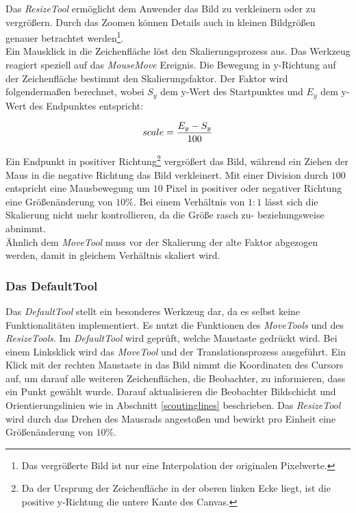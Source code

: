 Das \textit{ResizeTool} ermöglicht dem Anwender das Bild zu verkleinern oder zu vergrößern. Durch das Zoomen können Details auch in kleinen Bildgrößen genauer betrachtet werden\footnote{Das vergrößerte Bild ist nur eine Interpolation der originalen Pixelwerte.}.\\
Ein Mausklick in die Zeichenfläche löst den Skalierungsprozess aus. Das Werkzeug reagiert speziell auf das \textit{MouseMove} Ereignis. Die Bewegung in y-Richtung auf der Zeichenfläche bestimmt den Skalierungsfaktor. Der Faktor wird folgendermaßen berechnet, wobei $S_y$ dem y-Wert des Startpunktes  und $E_y$ dem y-Wert des Endpunktes entspricht: 

\begin{equation}
scale = \frac{E_y - S_y}{100}
\vspace{0.5cm}
\end{equation}

Ein Endpunkt in positiver Richtung\footnote{Da der Ursprung der Zeichenfläche in der oberen linken Ecke liegt, ist die positive y-Richtung die untere Kante des Canvas.} vergrößert das Bild, während ein Ziehen der Maus in die negative Richtung das Bild verkleinert. Mit einer Division durch $100$ entspricht eine Mausbewegung um $10$ Pixel in positiver oder negativer Richtung eine Größenänderung von $10\%$. Bei einem Verhältnis von $1:1$ lässt sich die Skalierung nicht mehr kontrollieren, da die Größe rasch zu- beziehungsweise abnimmt.\\
Ähnlich dem \textit{MoveTool} muss vor der Skalierung der alte Faktor abgezogen werden, damit in gleichem Verhältnis skaliert wird.

\subsubsection{Das DefaultTool}

Das \textit{DefaultTool} stellt ein besonderes Werkzeug dar, da es selbst keine Funktionalitäten implementiert. Es nutzt die Funktionen des \textit{MoveTools} und des \textit{ResizeTools}. Im \textit{DefaultTool} wird geprüft, welche Maustaste gedrückt wird. Bei einem Linksklick wird das \textit{MoveTool} und der Translationsprozess ausgeführt. Ein Klick mit der rechten Maustaste in das Bild nimmt die Koordinaten des Cursors auf, um darauf alle weiteren Zeichenflächen, die Beobachter, zu informieren, dass ein Punkt gewählt wurde. Darauf aktualisieren die Beobachter Bildschicht und Orientierungslinien wie in Abschnitt \ref{scoutinglines} beschrieben. Das \textit{ResizeTool} wird durch das Drehen des Mausrads angestoßen und bewirkt pro Einheit eine Größenänderung von $10\%$.

